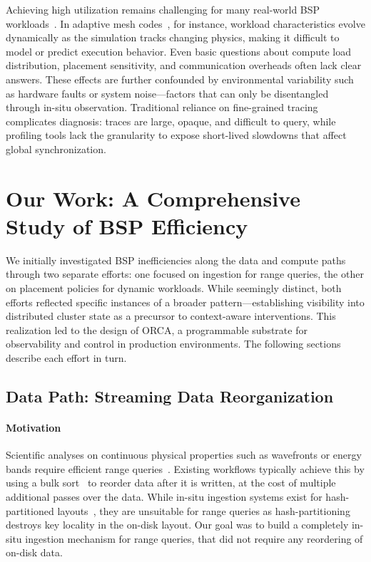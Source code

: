 Achieving high utilization remains challenging for many real-world BSP
workloads~\cite{Klenk2017:OverviewMPICharacteristics}.
In adaptive mesh codes~\cite{Dubey2014:Survey}, for instance, workload characteristics evolve
dynamically as the simulation tracks changing physics, making it difficult to model or predict
execution behavior.
Even basic questions about compute load distribution, placement sensitivity, and communication
overheads often lack clear answers.
These effects are further confounded by environmental variability such as hardware faults or system
noise—factors that can only be disentangled through in-situ observation.
Traditional reliance on fine-grained tracing~\cite{Wylie2025:15Years,Eschw2012:OTF2} complicates
diagnosis: traces are large, opaque, and difficult to query, while profiling tools lack the
granularity to expose short-lived slowdowns that affect global synchronization.

\section{Our Work: A Comprehensive Study of BSP Efficiency}

We initially investigated BSP inefficiencies along the data and compute paths through two separate
efforts: one focused on ingestion for range queries, the other on placement policies for dynamic
workloads.
While seemingly distinct, both efforts reflected specific instances of a broader
pattern—establishing visibility into distributed cluster state as a precursor to context-aware
interventions.
This realization led to the design of ORCA, a programmable substrate for observability and control
in production environments.
The following sections describe each effort in turn.

\subsection{Data Path: Streaming Data Reorganization}

\paragraph{Motivation}
Scientific analyses on continuous physical properties such as wavefronts or energy bands require
efficient range queries~\cite{Byna2012}.
Existing workflows typically achieve this by using a bulk
sort~\cite{Dong2016,Sunda2013:HykSort,Rasmu2011:TritonSort} to reorder data after it is written, at
the cost of multiple additional passes over the data.
While in-situ ingestion systems exist for hash-partitioned layouts~\cite{Zheng2018:DeltaFS}, they
are unsuitable for range queries as hash-partitioning destroys key locality in the on-disk layout.
Our goal was to build a completely in-situ ingestion mechanism for range queries, that did not
require any reordering of on-disk data.

